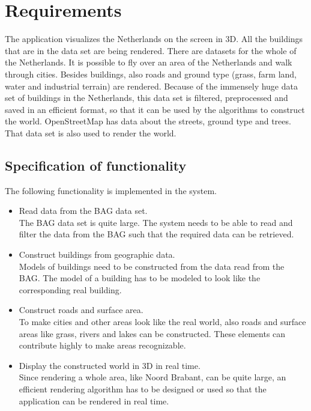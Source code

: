 \chapter{Requirements}
\label{chap:Requirements}
The application visualizes the Netherlands on the screen in 3D. All the buildings that are in the data set are being rendered. There are datasets for the whole of the Netherlands. It is possible to fly over an area of the Netherlands and walk through cities. Besides buildings, also roads and ground type (grass, farm land, water and industrial terrain) are rendered.
Because of the immensely huge data set of buildings in the Netherlands, this data set is filtered, preprocessed and saved in an efficient format, so that it can be used by the algorithms to construct the world. OpenStreetMap has data about the streets, ground type and trees. That data set is also used to render the world.

\section{Specification of functionality}
\label{sec:SpecificationOfFunctionality}
The following functionality is implemented in the system.
\begin{itemize}
  \item Read data from the BAG data set.\\
    The BAG data set is quite large. The system needs to be able to read and filter the data from the BAG such that the required data can be retrieved.
  \item Construct buildings from geographic data. \\
    Models of buildings need to be constructed from the data read from the BAG. The model of a building has to be modeled to look like the corresponding real building.
  \item Construct roads and surface area.\\
    To make cities and other areas look like the real world, also roads and surface areas like grass, rivers and lakes can be constructed. These elements can contribute highly to make areas recognizable.
  \item Display the constructed world in 3D in real time.\\
    Since rendering a whole area, like Noord Brabant, can be quite large, an efficient rendering algorithm has to be designed or used so that the application can be rendered in real time.
\end{itemize}
